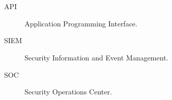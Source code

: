 \chapter*{\acronyms}

{\small\itshape\color{gray} \acronymsHelpText}

\begin{description}
    \item [API] Application Programming Interface.
    \item [SIEM] Security Information and Event Management.
    \item [SOC] Security Operations Center.
\end{description}
